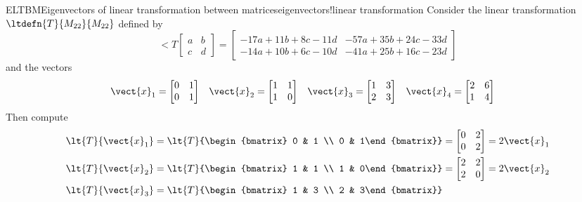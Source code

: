 \begin{example}{ELTBM}{Eigenvectors of linear transformation between matrices}{eigenvectors!linear transformation}
Consider the linear transformation $\ltdefn{T}{M_{22}}{M_{22}}$ defined by
%
\begin{equation*}
\lt{T}{\begin{bmatrix}a&b\\c&d\end{bmatrix}}
=
\begin{bmatrix}
-17a+11b+8c-11d
&
-57a+35b+24c-33d
\\
-14a+10b+6c-10d
&
-41a+25b+16c-23d
\end{bmatrix}
\end{equation*}
%
and the vectors
%
\begin{align*}
\vect{x}_1
&=
\begin{bmatrix}
 0 & 1 \\ 0 & 1
\end{bmatrix}
&
\vect{x}_2
&=
\begin{bmatrix}
 1 & 1 \\ 1 & 0
\end{bmatrix}
&
\vect{x}_3
&=
\begin{bmatrix}
 1 & 3 \\ 2 & 3
\end{bmatrix}
&
\vect{x}_4
&=
\begin{bmatrix}
 2 & 6 \\ 1 & 4
\end{bmatrix}
%
\end{align*}
%
Then compute
%
\begin{align*}
\lt{T}{\vect{x}_1}
&=
\lt{T}{\begin{bmatrix} 0 & 1 \\ 0 & 1\end{bmatrix}}
=
\begin{bmatrix}
 0 & 2 \\ 0 & 2
\end{bmatrix}
=
2\vect{x}_1\\
%
\lt{T}{\vect{x}_2}
&=
\lt{T}{\begin{bmatrix} 1 & 1 \\ 1 & 0\end{bmatrix}}
=
\begin{bmatrix}
 2 & 2 \\ 2 & 0
\end{bmatrix}
=
2\vect{x}_2\\
%
\lt{T}{\vect{x}_3}
&=
\lt{T}{\begin{bmatrix} 1 & 3 \\ 2 & 3\end{bmatrix}}

\end{align*}
\end{example}
